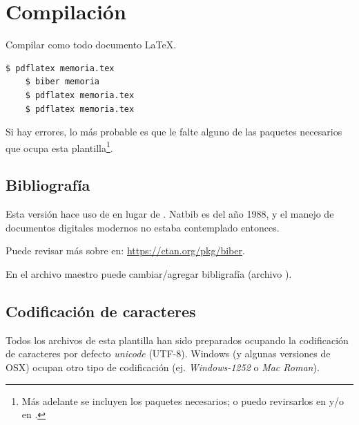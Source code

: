 \section{Compilación}

Compilar como todo documento \LaTeX{}.

\begin{Verbatim}[frame=lines, label=Consola (Shell) o Línea de comandos
, fontsize=\footnotesize
, baselinestretch=1
, formatcom=\color{gray}]
    $ pdflatex memoria.tex
    $ biber memoria
    $ pdflatex memoria.tex
    $ pdflatex memoria.tex
\end{Verbatim}

Si hay errores, lo más probable es que le falte alguno de las paquetes necesarios que ocupa esta plantilla\footnote{Más adelante se incluyen los paquetes necesarios; o puedo revirsarlos en  y/o en .}.

\subsection{Bibliografía}

Esta versión hace uso de  en lugar de . Natbib es del año 1988, y el manejo de documentos digitales modernos no estaba contemplado entonces.

Puede revisar más sobre  en:
\hyperref[https://ctan.org/pkg/biber]{https://ctan.org/pkg/biber}.

En el archivo maestro puede cambiar/agregar bibligrafía (archivo ).

\subsection{Codificación de caracteres}

Todos los archivos  de esta plantilla han sido preparados ocupando la codificación de caracteres por defecto \emph{unicode} (UTF-8). Windows (y algunas versiones de OSX) ocupan otro tipo de codificación (ej. \emph{Windows-1252} o \emph{Mac Roman}).


